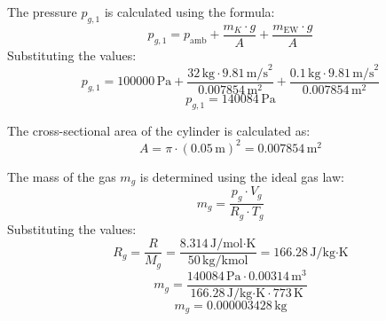 The pressure \( p_{g,1} \) is calculated using the formula:  
\[
p_{g,1} = p_{\text{amb}} + \frac{m_K \cdot g}{A} + \frac{m_{\text{EW}} \cdot g}{A}
\]  
Substituting the values:  
\[
p_{g,1} = 100000 \, \text{Pa} + \frac{32 \, \text{kg} \cdot 9.81 \, \text{m/s}^2}{0.007854 \, \text{m}^2} + \frac{0.1 \, \text{kg} \cdot 9.81 \, \text{m/s}^2}{0.007854 \, \text{m}^2}
\]  
\[
p_{g,1} = 140084 \, \text{Pa}
\]  

The cross-sectional area of the cylinder is calculated as:  
\[
A = \pi \cdot (0.05 \, \text{m})^2 = 0.007854 \, \text{m}^2
\]  

The mass of the gas \( m_g \) is determined using the ideal gas law:  
\[
m_g = \frac{p_g \cdot V_g}{R_g \cdot T_g}
\]  
Substituting the values:  
\[
R_g = \frac{R}{M_g} = \frac{8.314 \, \text{J/mol·K}}{50 \, \text{kg/kmol}} = 166.28 \, \text{J/kg·K}
\]  
\[
m_g = \frac{140084 \, \text{Pa} \cdot 0.00314 \, \text{m}^3}{166.28 \, \text{J/kg·K} \cdot 773 \, \text{K}}
\]  
\[
m_g = 0.000003428 \, \text{kg}
\]